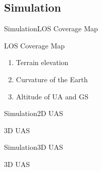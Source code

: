 \subsection{Simulation}

\begin{frame}{Simulation}{LOS Coverage Map}

  \begin{block}{LOS Coverage Map}
	  \begin{enumerate}
	  	\item Terrain elevation
	  	\item Curvature of the Earth
	  	\item Altitude of UA and GS
	  \end{enumerate}
  \end{block}
  

\end{frame}

\begin{frame}{Simulation}{2D UAS}

  \begin{block}{3D UAS}

  \end{block}

\end{frame}

\begin{frame}{Simulation}{3D UAS}

  \begin{block}{3D UAS}

  \end{block}

\end{frame}